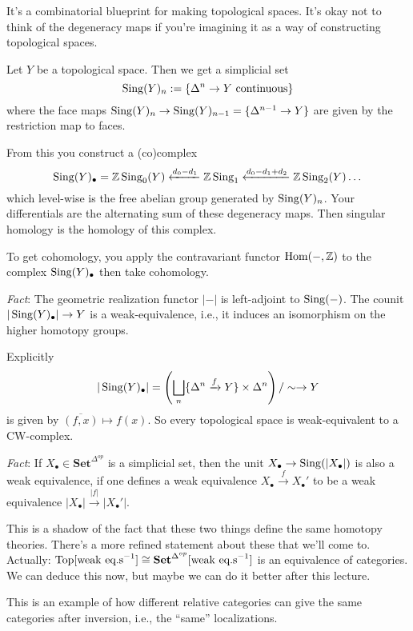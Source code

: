 \documentclass[../MH_Total.tex]{subfiles}
\begin{document}
It's a combinatorial blueprint for making topological spaces. It's okay not to think of the degeneracy maps if you're imagining it as a way of constructing topological spaces.

\begin{definition}
	Let $Y$ be a topological space. Then we get a simplicial set 
	\[
	\operatorname{Sing}(Y)_n := \{\Delta^n \to Y \text{ continuous}\}
	\]
	where the face maps $\operatorname{Sing}(Y)_n \to \operatorname{Sing}(Y)_{n-1} = \{\Delta^{n-1} \to Y\}$ are given by the restriction map to faces.

	From this you construct a (co)complex 
	\[
	\operatorname{Sing}(Y)_\bullet = \mathbb{Z}\operatorname{Sing}_0(Y) \xleftarrow{d_0 - d_1} \mathbb{Z}\operatorname{Sing}_1 \xleftarrow{d_0 - d_1 + d_2} \mathbb{Z}\operatorname{Sing}_2(Y) \dots
	\]
	which level-wise is the free abelian group generated by $\operatorname{Sing}(Y)_n$. Your differentials are the alternating sum of these degeneracy maps. Then singular homology is the homology of this complex.

	To get cohomology, you apply the contravariant functor $\operatorname{Hom}(-,\mathbb{Z})$ to the complex $\operatorname{Sing}(Y)_\bullet$ then take cohomology.
\end{definition}

\emph{Fact}: The geometric realization functor $|-|$ is left-adjoint to $\operatorname{Sing}(-)$. The counit $|\operatorname{Sing}(Y)_\bullet| \to Y$ is a weak-equivalence, i.e., it induces an isomorphism on the higher homotopy groups. 

Explicitly
\[
|\operatorname{Sing}(Y)_\bullet| = \left(\bigsqcup_n \{\Delta^n \xrightarrow{f} Y\} \times \Delta^n\right)/\sim \to Y
\]
is given by $\overline{(f,x)} \mapsto f(x)$. So every topological space is weak-equivalent to a CW-complex. 

\emph{Fact}: If $X_\bullet \in \mathbf{Set}^{\Delta^{op}}$ is a simplicial set, then the unit $X_\bullet \to \operatorname{Sing}(|X_\bullet|)$ is also a weak equivalence, if one defines a weak equivalence $X_\bullet \xrightarrow{f} X_\bullet'$ to be a weak equivalence $|X_\bullet| \xrightarrow{|f|} |X_\bullet'|$. 

This is a shadow of the fact that these two things define the same homotopy theories. There's a more refined statement about these that we'll come to. Actually: $\operatorname{Top}[\text{weak eq.s}^{-1}] \cong \mathbf{Set}^{\Delta^{op}}[\text{weak eq.s}^{-1}]$ is an equivalence of categories. We can deduce this now, but maybe we can do it better after this lecture.

This is an example of how different relative categories can give the same categories after inversion, i.e., the ``same'' localizations. 
\end{document}
